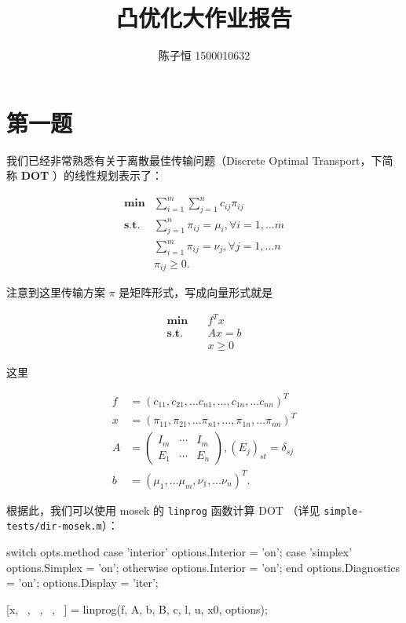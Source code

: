 \documentclass[]{article}
\date{}
\newenvironment{Shaded}{}{}
\newcommand{\NormalTok}[1]{#1}
\newcommand{\StringTok}[1]{\textcolor[rgb]{0.25,0.44,0.63}{#1}}
\begin{document}
\title{凸优化大作业报告}

\author{陈子恒 1500010632}
\maketitle

\part{第一题}

我们已经非常熟悉有关于离散最佳传输问题（Discrete Optimal
Transport，下简称 \textbf{DOT} ）的线性规划表示了：

\begin{align}
\textbf{min} & \sum_{i=1}^m \sum_{j=1}^n c_{ij} \pi_{ij} \\
\textbf{s.t.} & \sum_{j=1}^n \pi_{ij}=\mu_i, \forall i=1, \dots m \\ 
& \sum_{i=1}^m \pi_{ij}=\nu_j, \forall j=1, \dots n \\ 
& \pi_{ij} \ge 0.
\end{align}

注意到这里传输方案 \(\pi\) 是矩阵形式，写成向量形式就是

\begin{align}
\textbf{min} \quad & f^T x\\
\textbf{s.t.} \quad & A x=b \\
&x \ge 0
\end{align}

这里

\begin{align}
f &= (c_{11}, c_{21}, \dots c_{n1}, \dots, c_{1n}, \dots c_{nn})^T \\
x &= (\pi_{11}, \pi_{21}, \dots \pi_{n1}, \dots, \pi_{1n}, \dots \pi_{nn})^T \\
A &= \begin{pmatrix} I_m & \cdots & I_m \\ E_1 &\cdots & E_n \end{pmatrix} , (E_j)_{st}=\delta_{sj} \\
b &= (\mu_1, \dots \mu_m, \nu_1, \dots \nu_n)^T.
\end{align}

根据此，我们可以使用 mosek 的 \texttt{linprog} 函数计算 DOT （详见
\texttt{simple-tests/dir-mosek.m}）：

\begin{Shaded}
\begin{Highlighting}[]
\NormalTok{switch opts.method}
\NormalTok{    case }\StringTok{'interior'}
\NormalTok{        options.Interior = }\StringTok{'on'}\NormalTok{;}
\NormalTok{    case }\StringTok{'simplex'}
\NormalTok{        options.Simplex = }\StringTok{'on'}\NormalTok{;}
\NormalTok{    otherwise}
\NormalTok{        options.Interior = }\StringTok{'on'}\NormalTok{;}
\NormalTok{end}
\NormalTok{options.Diagnostics = }\StringTok{'on'}\NormalTok{;}
\NormalTok{options.Display = }\StringTok{'iter'}\NormalTok{;}

\NormalTok{[x, ~, ~, ~, ~] = linprog(f, A, b, B, c, l, u, x0, options);}
\end{Highlighting}
\end{Shaded}
\end{document}
